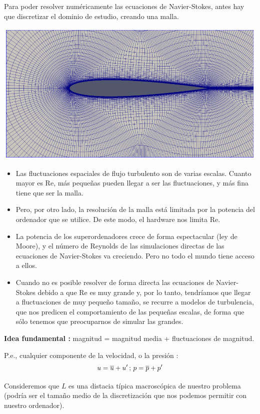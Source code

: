 	Para poder resolver numéricamente las ecuaciones de Navier-Stokes,
	antes hay que discretizar el dominio de estudio, creando una malla.
	

\begin{center}
	\includegraphics[width=0.7\linewidth]{TeX_files/chapter07-Turbulencia/airfoil}
\end{center}
	
	
	\begin{itemize}
		\item Las fluctuaciones espaciales de flujo turbulento son de varias escalas.
		Cuanto mayor es Re, más pequeñas pueden llegar a ser las fluctuaciones,
		y más fina tiene que ser la malla. 
		\item Pero, por otro lado, la resolución de la malla está limitada por la
		potencia del ordenador que se utilice. De este modo, el hardware nos
		limita Re.
		\item La potencia de los superordenadores crece de forma espectacular (ley
		de Moore), y el número de Reynolds de las simulaciones directas de
		las ecuaciones de Navier-Stokes va creciendo. Pero no todo el mundo
		tiene acceso a ellos.
		\item Cuando no es posible resolver de forma directa las ecuaciones de Navier-Stokes
		debido a que Re es muy grande y, por lo tanto, tendríamos que llegar
		a fluctuaciones de muy pequeño tamaño, se recurre a modelos de turbulencia,
		que nos predicen el comportamiento de las pequeñas escalas, de forma
		que sólo tenemos que preocuparnos de simular las grandes.
	\end{itemize}
	
	\textbf{Idea fundamental :}
		magnitud = magnitud media + fluctuaciones de magnitud.

	P.e., cualquier componente de la velocidad, o la presión : 
	\[
	u=\overline{u}+u'\,;\,p=\overline{p}+p'
	\]
	
	
	Consideremos que $L$ es una distacia típica macroscópica de nuestro
	problema (podría ser el tamaño medio de la discretización que nos
	podemos permitir con nuestro ordenador).
	
